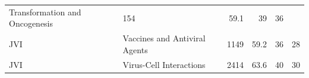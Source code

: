 \documentclass[11pt,]{article}
\begin{document}
\begin{longtable}[]{@{}llrrrr@{}}
\begin{minipage}[t]{0.43\columnwidth}
Transformation and Oncogenesis\strut
\end{minipage} & \begin{minipage}[t]{0.04\columnwidth}\raggedleft\strut
154\strut
\end{minipage} & \begin{minipage}[t]{0.08\columnwidth}\raggedleft\strut
59.1\strut
\end{minipage} & \begin{minipage}[t]{0.11\columnwidth}\raggedleft\strut
39\strut
\end{minipage} & \begin{minipage}[t]{0.11\columnwidth}\raggedleft\strut
36\strut
\end{minipage}\tabularnewline
\begin{minipage}[t]{0.06\columnwidth}\raggedright\strut
JVI\strut
\end{minipage} & \begin{minipage}[t]{0.43\columnwidth}\raggedright\strut
Vaccines and Antiviral Agents\strut
\end{minipage} & \begin{minipage}[t]{0.04\columnwidth}\raggedleft\strut
1149\strut
\end{minipage} & \begin{minipage}[t]{0.08\columnwidth}\raggedleft\strut
59.2\strut
\end{minipage} & \begin{minipage}[t]{0.11\columnwidth}\raggedleft\strut
36\strut
\end{minipage} & \begin{minipage}[t]{0.11\columnwidth}\raggedleft\strut
28\strut
\end{minipage}\tabularnewline
\begin{minipage}[t]{0.06\columnwidth}\raggedright\strut
JVI\strut
\end{minipage} & \begin{minipage}[t]{0.43\columnwidth}\raggedright\strut
Virus-Cell Interactions\strut
\end{minipage} & \begin{minipage}[t]{0.04\columnwidth}\raggedleft\strut
2414\strut
\end{minipage} & \begin{minipage}[t]{0.08\columnwidth}\raggedleft\strut
63.6\strut
\end{minipage} & \begin{minipage}[t]{0.11\columnwidth}\raggedleft\strut
40\strut
\end{minipage} & \begin{minipage}[t]{0.11\columnwidth}\raggedleft\strut
30\strut
\end{minipage}\tabularnewline
\bottomrule
\end{longtable}
\end{document}
